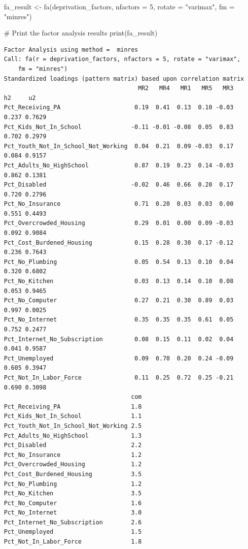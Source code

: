 \documentclass[
  letterpaper,
  DIV=11,
  numbers=noendperiod]{scrreprt}
\newenvironment{Shaded}{\begin{snugshade}}{\end{snugshade}}
\newcommand{\AttributeTok}[1]{\textcolor[rgb]{0.40,0.45,0.13}{#1}}
\newcommand{\CommentTok}[1]{\textcolor[rgb]{0.37,0.37,0.37}{#1}}
\newcommand{\DecValTok}[1]{\textcolor[rgb]{0.68,0.00,0.00}{#1}}
\newcommand{\FunctionTok}[1]{\textcolor[rgb]{0.28,0.35,0.67}{#1}}
\newcommand{\NormalTok}[1]{\textcolor[rgb]{0.00,0.23,0.31}{#1}}
\newcommand{\OtherTok}[1]{\textcolor[rgb]{0.00,0.23,0.31}{#1}}
\newcommand{\StringTok}[1]{\textcolor[rgb]{0.13,0.47,0.30}{#1}}
\begin{document}
\begin{Shaded}
\begin{Highlighting}[]
\NormalTok{fa\_result }\OtherTok{\textless{}{-}} \FunctionTok{fa}\NormalTok{(deprivation\_factors, }\AttributeTok{nfactors =} \DecValTok{5}\NormalTok{, }\AttributeTok{rotate =} \StringTok{"varimax"}\NormalTok{, }\AttributeTok{fm =} \StringTok{"minres"}\NormalTok{)}

\CommentTok{\# Print the factor analysis results}
\FunctionTok{print}\NormalTok{(fa\_result)}
\end{Highlighting}
\end{Shaded}

\begin{verbatim}
Factor Analysis using method =  minres
Call: fa(r = deprivation_factors, nfactors = 5, rotate = "varimax", 
    fm = "minres")
Standardized loadings (pattern matrix) based upon correlation matrix
                                      MR2   MR4   MR1   MR5   MR3    h2     u2
Pct_Receiving_PA                     0.19  0.41  0.13  0.10 -0.03 0.237 0.7629
Pct_Kids_Not_In_School              -0.11 -0.01 -0.08  0.05  0.83 0.702 0.2979
Pct_Youth_Not_In_School_Not_Working  0.04  0.21  0.09 -0.03  0.17 0.084 0.9157
Pct_Adults_No_HighSchool             0.87  0.19  0.23  0.14 -0.03 0.862 0.1381
Pct_Disabled                        -0.02  0.46  0.66  0.20  0.17 0.720 0.2796
Pct_No_Insurance                     0.71  0.20  0.03  0.03  0.00 0.551 0.4493
Pct_Overcrowded_Housing              0.29  0.01  0.00  0.09 -0.03 0.092 0.9084
Pct_Cost_Burdened_Housing            0.15  0.28  0.30  0.17 -0.12 0.236 0.7643
Pct_No_Plumbing                      0.05  0.54  0.13  0.10  0.04 0.320 0.6802
Pct_No_Kitchen                       0.03  0.13  0.14  0.10  0.08 0.053 0.9465
Pct_No_Computer                      0.27  0.21  0.30  0.89  0.03 0.997 0.0025
Pct_No_Internet                      0.35  0.35  0.35  0.61  0.05 0.752 0.2477
Pct_Internet_No_Subscription         0.08  0.15  0.11  0.02  0.04 0.041 0.9587
Pct_Unemployed                       0.09  0.70  0.20  0.24 -0.09 0.605 0.3947
Pct_Not_In_Labor_Force               0.11  0.25  0.72  0.25 -0.21 0.690 0.3098
                                    com
Pct_Receiving_PA                    1.8
Pct_Kids_Not_In_School              1.1
Pct_Youth_Not_In_School_Not_Working 2.5
Pct_Adults_No_HighSchool            1.3
Pct_Disabled                        2.2
Pct_No_Insurance                    1.2
Pct_Overcrowded_Housing             1.2
Pct_Cost_Burdened_Housing           3.5
Pct_No_Plumbing                     1.2
Pct_No_Kitchen                      3.5
Pct_No_Computer                     1.6
Pct_No_Internet                     3.0
Pct_Internet_No_Subscription        2.6
Pct_Unemployed                      1.5
Pct_Not_In_Labor_Force              1.8


\end{verbatim}
\end{document}
